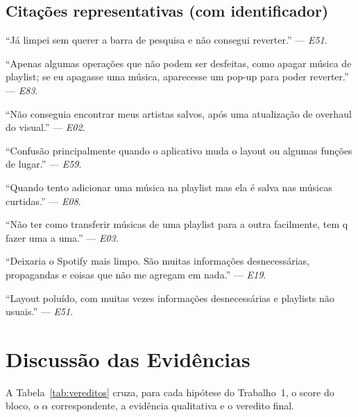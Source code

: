 \documentclass[12pt,a4paper]{article}
\begin{document}
\subsection{Citações representativas (com identificador)}
\begin{description}[leftmargin=2cm, style=nextline]
  \item[\textbf{H3 (Controle)}] ``Já limpei sem querer a barra de pesquisa e não
       consegui reverter.'' --- \emph{E51}.
  \item[\textbf{H3 (Controle)}] ``Apenas algumas operações que não podem ser desfeitas,
       como apagar música de playlist; se eu apagasse uma música, aparecesse um pop-up
       para poder reverter.'' --- \emph{E83}.
  \item[\textbf{H4 (Consistência)}] ``Não conseguia encontrar meus artistas salvos,
       após uma atualização de overhaul do visual.'' --- \emph{E02}.
  \item[\textbf{H4 (Consistência)}] ``Confusão principalmente quando o aplicativo muda
       o layout ou algumas funções de lugar.'' --- \emph{E59}.
  \item[\textbf{H5 (Prevenção)}] ``Quando tento adicionar uma música na playlist mas
       ela é salva nas músicas curtidas.'' --- \emph{E08}.
  \item[\textbf{H7 (Flexibilidade)}] ``Não ter como transferir músicas de uma playlist
       para a outra facilmente, tem q fazer uma a uma.'' --- \emph{E03}.
  \item[\textbf{H8 (Estética)}] ``Deixaria o Spotify mais limpo. São muitas informações
       desnecessárias, propagandas e coisas que não me agregam em nada.'' --- \emph{E19}.
  \item[\textbf{H8 (Estética)}] ``Layout poluído, com muitas vezes informações
       desnecessárias e playlists não usuais.'' --- \emph{E51}.
\end{description}

\section{Discussão das Evidências}
\label{sec:discussao}

A Tabela~\ref{tab:vereditos} cruza, para cada hipótese do Trabalho~1, o score do bloco,
o $\alpha$ correspondente, a evidência qualitativa e o veredito final.
\end{document}
